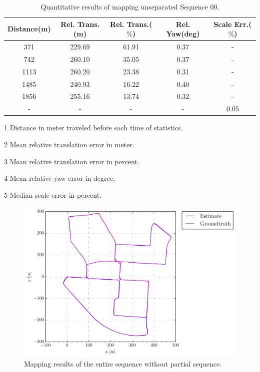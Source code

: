 \begin{table}
	\centering
	\caption{Quantitative results of mapping unseparated Sequence 00.}
	\begin{threeparttable}
		\begin{tabular}{|c|c|c|c|c|}
			\hline
			Distance(m)\tnote{1} & Rel. Trans.(m)\tnote{2}  & Rel. Trans.($\%$)\tnote{3} & Rel. Yaw(deg)\tnote{4} & Scale Err.($\%$)\tnote{5}  \\
			\hline
			371& 229.69 & 61.91 & 0.37 & - \\
			\hline
			742&260.10& 35.05 & 0.37 & - \\
			\hline
			1113&260.20& 23.38 & 0.31 & - \\
			\hline
			1485&240.93& 16.22 & 0.40 & - \\
			\hline
			1856&255.16& 13.74 & 0.32 & - \\
			\hline
			-&-&- & - &  0.05\\
			\hline
		\end{tabular}
		\begin{tablenotes}
			\footnotesize
			\item[1] Distance in meter traveled before each time of statistics. 
			\item[2] Mean relative translation error in meter.
			\item[3] Mean relative translation error in percent.
			\item[4] Mean relative yaw error in degree.
			\item[5] Median scale error in percent.
		\end{tablenotes}
	\end{threeparttable}
	\label{tbl:kitticlientquanresult}
\end{table}

\begin{figure}[H]
	\centering
	\includegraphics[width=5in]{Chapter4/KITTI/00/gps/plots/trajectory_side_sim3_-1.pdf}
	\caption{Mapping results of the entire sequence without partial sequence.}
	\label{fig:kitticlientmapping} 
\end{figure}

